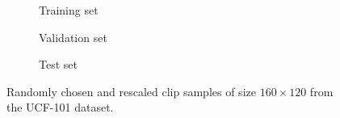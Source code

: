 \begin{figure}[htpb]
\centering
\begin{subfigure}{1.0\textwidth}
  \centering
  \caption{Training set}
  \label{fig:ucf_train_full}
  \vspace{.1cm}
\end{subfigure}
\begin{subfigure}{1.0\textwidth}
  \centering
  \caption{Validation set}
  \label{fig:ucf_valid_full}
  \vspace{.1cm}
\end{subfigure}
\begin{subfigure}{1.0\textwidth}
  \centering
  \caption{Test set}
  \label{fig:ucf_test_full}
\end{subfigure}
\caption[UCF-101 Full Image Samples]{Randomly chosen and rescaled clip samples of size $160 \times 120$ from the UCF-101 dataset.}
\label{fig:ucf_full}
\end{figure}
